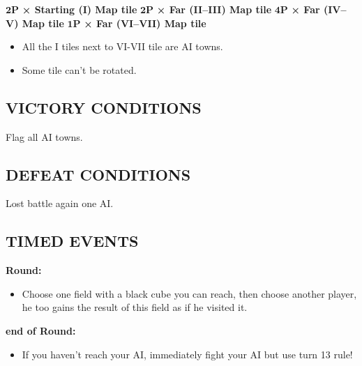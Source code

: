 \begin{multicols*}{2}
$\boldsymbol{2 P}$ \textbf{× Starting (I) Map tile}
$\boldsymbol{2 P}$ \textbf{× Far (II--III) Map tile}
$\boldsymbol{4 P}$ \textbf{× Far (IV--V) Map tile}
$\boldsymbol{1 P}$ \textbf{× Far (VI--VII) Map tile}
\begin{itemize}
    \item All the I tiles next to VI-VII tile are AI towns.
    \item Some tile can't be rotated.
\end{itemize}

\subsection*{\MakeUppercase{Victory Conditions}}

Flag all AI towns.

\subsection*{\MakeUppercase{Defeat Conditions}}

Lost battle again one AI.

\subsection*{\MakeUppercase{Timed Events}}

\textbf{ Round:}
\begin{itemize}
  \item Choose one field with a black cube you can reach, then choose another player, he too gains the result of this field as if he visited it.
\end{itemize}
\textbf{end of  Round:}
\begin{itemize}
    \item If you haven't reach your AI, immediately fight your AI but use turn 13 rule!
\end{itemize}


\end{multicols*}
